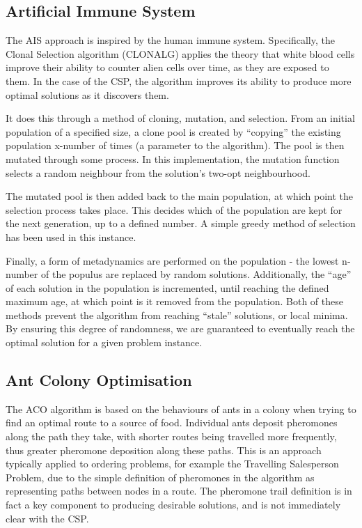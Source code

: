\documentclass{article}
\begin{document}
  \subsection{Artificial Immune System}

    The AIS approach is inspired by the human immune system. Specifically, the Clonal Selection algorithm (CLONALG) applies the theory that white blood cells improve their ability to counter alien cells over time, as they are exposed to them. In the case of the CSP, the algorithm improves its ability to produce more optimal solutions as it discovers them.

    \bigskip

    It does this through a method of cloning, mutation, and selection. From an initial population of a specified size, a clone pool is created by ``copying'' the existing population x-number of times (a parameter to the algorithm). The pool is then mutated through some process. In this implementation, the mutation function selects a random neighbour from the solution's two-opt neighbourhood.

    \bigskip

    The mutated pool is then added back to the main population, at which point the selection process takes place. This decides which of the population are kept for the next generation, up to a defined number. A simple greedy method of selection has been used in this instance.

    \bigskip

    Finally, a form of metadynamics are performed on the population - the lowest n-number of the populus are replaced by random solutions. Additionally, the ``age'' of each solution in the population is incremented, until reaching the defined maximum age, at which point is it removed from the population. Both of these methods prevent the algorithm from reaching ``stale'' solutions, or local minima. By ensuring this degree of randomness, we are guaranteed to eventually reach the optimal solution for a given problem instance.

  \subsection{Ant Colony Optimisation}

    The ACO algorithm is based on the behaviours of ants in a colony when trying to find an optimal route to a source of food. Individual ants deposit pheromones along the path they take, with shorter routes being travelled more frequently, thus greater pheromone deposition along these paths. This is an approach typically applied to ordering problems, for example the Travelling Salesperson Problem, due to the simple definition of pheromones in the algorithm as representing paths between nodes in a route. The pheromone trail definition is in fact a key component to producing desirable solutions, and is not immediately clear with the CSP.
\end{document}
